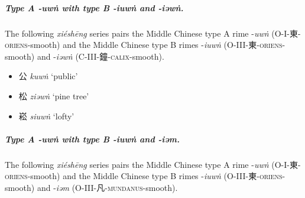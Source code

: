 \subparagraph{Type A -\textit{uwṅ} with type B -\textit{iuwṅ} and
-\textit{iəwṅ}.}
\label{subpara:typeA-uwng-typeB-iuwng-iewng}
The following \textit{xiéshēng} series pairs the Middle Chinese type A rime -\textit{uwṅ} (O-I-東-\textsc{oriens}-smooth) and the Middle Chinese type B rimes -\textit{iuwṅ} (O-III-東-\textsc{oriens}-smooth) and -\textit{iəwṅ} (C-III-鐘-\textsc{calix}-smooth).

\begin{minipage}{\columnwidth}
\begin{itemize}[leftmargin=*, labelsep=0.5em]  
  \item {\Large{公}} %
    \textit{kuwṅ} `public' %

  \item {\Large{松}} %
    \textit{ziəwṅ} `pine tree' %

  \item {\Large{崧}} %
    \textit{siuwṅ} `lofty' %
\end{itemize}
\end{minipage}

\bigskip 

\subparagraph{Type A -\textit{uwṅ} with type B -\textit{iuwṅ} and -\textit{iəm}.} 
\label{subpara:typeA-uwng-typeB-iuwng-iem}
The following \textit{xiéshēng} series pairs the Middle Chinese type A rime -\textit{uwṅ} (O-I-東-\textsc{oriens}-smooth) and the Middle Chinese type B rimes -\textit{iuwṅ} (O-III-東-\textsc{oriens}-smooth) and  -\textit{iəm} (O-III-凡-\textsc{mundanus}-smooth).

\medskip



